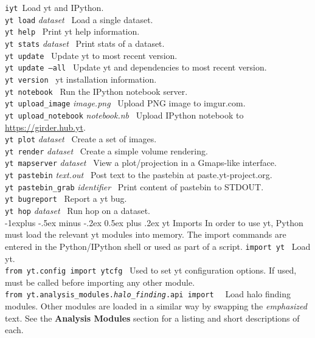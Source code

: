 \documentclass[10pt,landscape]{article}
\makeatletter
\renewcommand{\subsection}{\@startsection{subsection}{2}{0mm}%
                                {-1explus -.5ex minus -.2ex}%
                                {0.5ex plus .2ex}%
                                {\normalfont\normalsize\bfseries}}
\makeatother
\begin{document}
\begin{multicols}{3}
\texttt{iyt}\textemdash\ Load yt and IPython. \\
\texttt{yt load} \textit{dataset}   \textemdash\ Load a single dataset.  \\
\texttt{yt help} \textemdash\ Print yt help information. \\
\texttt{yt stats} \textit{dataset} \textemdash\ Print stats of a dataset. \\
\texttt{yt update} \textemdash\ Update yt to most recent version.\\
\texttt{yt update --all} \textemdash\ Update yt and dependencies to most recent version. \\
\texttt{yt version} \textemdash\ yt installation information. \\
\texttt{yt notebook} \textemdash\ Run the IPython notebook server. \\
\texttt{yt upload\_image} \textit{image.png} \textemdash\ Upload PNG image to imgur.com. \\
\texttt{yt upload\_notebook} \textit{notebook.nb} \textemdash\ Upload IPython notebook to \url{https://girder.hub.yt}.\\
\texttt{yt plot} \textit{dataset} \textemdash\ Create a set of images.\\
\texttt{yt render} \textit{dataset} \textemdash\ Create a simple
 volume rendering. \\
\texttt{yt mapserver} \textit{dataset} \textemdash\ View a plot/projection in a Gmaps-like
 interface. \\
\texttt{yt pastebin} \textit{text.out} \textemdash\ Post text to the pastebin at
 paste.yt-project.org. \\
\texttt{yt pastebin\_grab} \textit{identifier} \textemdash\ Print content of pastebin to
 STDOUT. \\
\texttt{yt bugreport} \textemdash\ Report a yt bug. \\
\texttt{yt hop} \textit{dataset} \textemdash\  Run hop on a dataset. \\

\subsection{yt Imports}
In order to use yt, Python must load the relevant yt modules into memory.
The import commands are entered in the Python/IPython shell or
used as part of a script.
\newlength{\MyLen}
\texttt{import yt}  \textemdash\
Load yt. \\
\texttt{from yt.config import ytcfg}  \textemdash\
Used to set yt configuration options.
If used, must be called before importing any other module.\\
\texttt{from yt.analysis\_modules.\emph{halo\_finding}.api import \textasteriskcentered}  \textemdash\
Load halo finding modules. Other modules
are loaded in a similar way by swapping the
\emph{emphasized} text.
See the \textbf{Analysis Modules} section for a listing and short descriptions of each.


\end{multicols}
\end{document}

